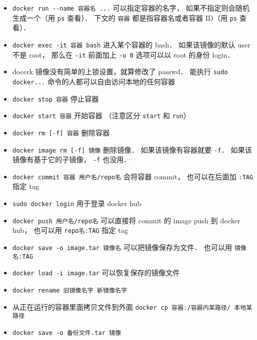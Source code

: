\begin{itemize}
\item \verb|docker run --name 容器名 ...| 可以指定容器的名字， 如果不指定则会随机生成一个（用 \verb|ps| 查看）． 下文的 \verb|容器| 都是指容器名或者容器 ID（用 \verb|ps| 查看）．
\item \verb`docker exec -it 容器 bash` 进入某个容器的 bash． 如果该镜像的默认 user 不是 root， 那么在 \verb|-it| 前面加上 \verb|-u 0| 选项可以以 root 的身份 login．
\item docerk 镜像没有简单的上锁设置，就算修改了 passwd． 能执行 \verb`sudo docker...` 命令的人都可以自由访问本地的任何容器
\item \verb`docker stop 容器` 停止容器
\item \verb`docker start 容器` 开始容器 （注意区分 \verb|start| 和 \verb|run|）
\item \verb`docker rm [-f] 容器` 删除容器
\item \verb`docker image rm [-f] 镜像` 删除镜像． 如果该镜像有容器就要 \verb|-f|． 如果该镜像有基于它的子镜像， \verb|-f| 也没用．·
\item \verb`docker commit 容器 用户名/repo名` 会将容器 commit， 也可以在后面加 \verb`:TAG` 指定 tag
\item \verb`sudo docker login` 用于登录 docker hub
\item \verb`docker push 用户名/repo名` 可以直接将 commit 的 image push 到 docker hub， 也可以用 \verb`repo名:TAG` 指定 tag
\item \verb|docker save -o image.tar 镜像名| 可以把镜像保存为文件． 也可以用 \verb|镜像名:TAG|
\item \verb|docker load -i image.tar| 可以恢复保存的镜像文件
\item \verb|docker rename 旧镜像名字 新镜像名字|
\item 从正在运行的容器里面拷贝文件到外面 \verb|docker cp 容器:/容器内某路径/ 本地某路径|
\item \verb|docker save -o 备份文件.tar 镜像|
\end{itemize}

